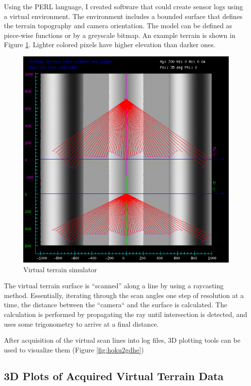 \documentclass[a4paper,11pt]{report}
\begin{document}
Using the PERL language, I created software that could create sensor logs using a virtual environment. The environment includes a bounded surface that defines the terrain topography and camera orientation. The model can be defined as piece-wise functions or by a greyscale bitmap. An example terrain is shown in Figure \ref{fig:mkvirt}. Lighter colored pixels have higher elevation than darker ones.

\begin{figure}[ht]
 \centering
 \includegraphics[width=12cm]{Mkvirtsample.png}
 \caption{Virtual terrain simulator}
 \label{fig:mkvirt}
\end{figure}

The virtual terrain surface is ``scanned'' along a line by using a raycasting method. Essentially, iterating through the scan angles one step of resolution at a time, the distance between the ``camera`` and the surface is calculated. The calculation is performed by propagating the ray until intersection is detected, and uses some trigonometry to arrive at a final distance.

After acquisition of the virtual scan lines into log files, 3D plotting tools can be used to visualize them (Figure \ref{fig:hoku2gdhe})

\subsection{3D Plots of Acquired Virtual Terrain Data}
\end{document}
